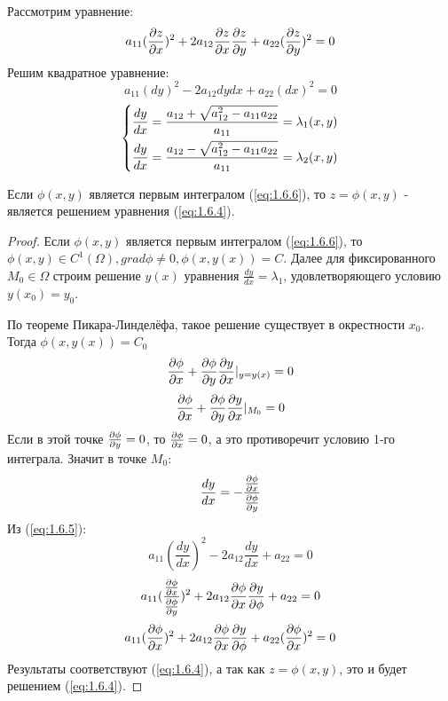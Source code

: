 \documentclass[../main.tex]{subfiles}
\begin{document}
	Рассмотрим уравнение:
	\begin{equation}\label{eq:1.6.4}
		a_{11}(\frac{\partial z}{\partial x})^2+2a_{12}\frac{\partial z}{\partial x}\frac{\partial z}{\partial y}+a_{22}(\frac{\partial z}{\partial y})^2=0
	\end{equation}
	Решим квадратное уравнение:
	\begin{equation}\label{eq:1.6.5}
		a_{11}(dy)^2-2a_{12}dydx+a_{22}(dx)^2=0
	\end{equation}
	\begin{equation}\label{eq:1.6.6}
		\begin{dcases}
			\frac{dy}{dx} = \frac{a_{12}+\sqrt{a_{12}^2-a_{11}a_{22}}}{a_{11}}=\lambda_1(x,y) \\
			\frac{dy}{dx} = \frac{a_{12}-\sqrt{a_{12}^2-a_{11}a_{22}}}{a_{11}}=\lambda_2(x,y)
		\end{dcases}
	\end{equation}
	\begin{theorem}
		\label{th:1.6.1}
		Если $\phi(x,y)$ является первым интегралом (\ref{eq:1.6.6}), то $z=\phi(x,y)$ - является решением уравнения (\ref{eq:1.6.4}).
	\end{theorem}
	\begin{proof}
	\par Если $\phi(x,y)$ является первым интегралом (\ref{eq:1.6.6}), то $\phi(x,y) \in C^1(\Omega), grad \phi \ne 0, \phi(x,y(x))=C$. Далее для фиксированного $M_0\in\Omega$ строим решение $y(x)$ уравнения $\frac{dy}{dx}=\lambda_1$, удовлетворяющего условию $y(x_0)=y_0$.\\
	\par По теореме Пикара-Линделёфа, такое решение существует в окрестности $x_0$. Тогда $\phi(x,y(x))=C_0$
	$$\frac{\partial \phi}{\partial x}+\frac{\partial \phi}{\partial y}\frac{\partial y}{\partial x}|_{y=y(x)}=0$$
	$$\frac{\partial \phi}{\partial x}+\frac{\partial \phi}{\partial y}\frac{\partial y}{\partial x}|_{M_0}=0$$
	Если в этой точке $\frac{\partial \phi}{\partial y}=0$, то $\frac{\partial \phi}{\partial x}=0$, а это противоречит условию 1-го интеграла. Значит в точке $M_0$:
	$$\frac{dy}{dx}=-\frac{\frac{\partial \phi}{\partial x}}{\frac{\partial \phi}{\partial y}}$$
	Из (\ref{eq:1.6.5}):
	$$ a_{11}(\frac{dy}{dx})^2-2a_{12}\frac{dy}{dx}+a_{22}=0$$
	$$ a_{11}(\frac{\frac{\partial \phi}{\partial x}}{\frac{\partial \phi}{\partial y}})^2+2a_{12}\frac{\partial \phi}{\partial x}\frac{\partial y}{\partial \phi}+a_{22}=0$$
	$$ a_{11}(\frac{\partial \phi}{\partial x})^2+2a_{12}\frac{\partial \phi}{\partial x}\frac{\partial y}{\partial \phi}+a_{22}(\frac{\partial \phi}{\partial x})^2=0$$
	Результаты соответствуют (\ref{eq:1.6.4}), а так как $z = \phi(x,y)$, это и будет решением (\ref{eq:1.6.4}).
	\end{proof}
	
\end{document}
